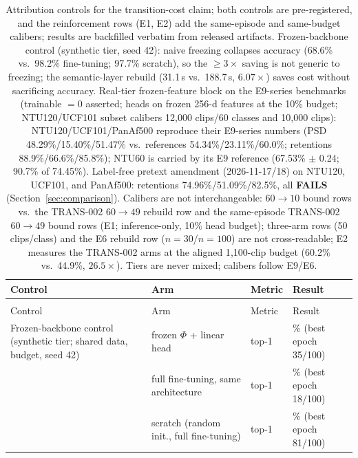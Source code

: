\begingroup
\footnotesize
{}
\begin{longtable}{>{\raggedright\arraybackslash}p{3.2cm}>{\raggedright\arraybackslash}p{2.6cm}>{\raggedright\arraybackslash}p{2.6cm}>{\raggedright\arraybackslash}p{\dimexpr\linewidth-8.4cm-8\tabcolsep\relax}}
\caption{Attribution controls for the transition-cost claim; both controls are pre-registered, and the reinforcement rows (E1, E2) add the same-episode and same-budget calibers; results are backfilled verbatim from released artifacts. Frozen-backbone control (synthetic tier, seed 42): naive freezing collapses accuracy (68.6\% vs.\ 98.2\% fine-tuning; 97.7\% scratch), so the $\geq 3\times$ saving is not generic to freezing; the semantic-layer rebuild (31.1\,s vs.\ 188.7\,s, $6.07\times$) saves cost without sacrificing accuracy. Real-tier frozen-feature block on the E9-series benchmarks (trainable $=0$ asserted; heads on frozen 256-d features at the 10\% budget; NTU120/UCF101 subset calibers 12{,}000 clips/60 classes and 10{,}000 clips): NTU120/UCF101/PanAf500 reproduce their E9-series numbers (PSD 48.29\%/15.40\%/51.47\% vs.\ references 54.34\%/23.11\%/60.0\%; retentions 88.9\%/66.6\%/85.8\%); NTU60 is carried by its E9 reference (67.53\% $\pm$ 0.24; 90.7\% of 74.45\%). Label-free pretext amendment (2026-11-17/18) on NTU120, UCF101, and PanAf500: retentions 74.96\%/51.09\%/82.5\%, all \textbf{FAILS} (Section~\ref{sec:comparison}). Calibers are not interchangeable: $60\to10$ bound rows vs.\ the TRANS-002 $60\to49$ rebuild row and the same-episode TRANS-002 $60\to49$ bound rows (E1; inference-only, 10\% head budget); three-arm rows (50 clips/class) and the E6 rebuild row ($n{=}30$/$n{=}100$) are not cross-readable; E2 measures the TRANS-002 arms at the aligned 1{,}100-clip budget (60.2\% vs.\ 44.9\%, $26.5\times$). Tiers are never mixed; calibers follow E9/E6.}
\label{tab:attribution-controls}\\
\hline
Control & Arm & Metric & Result \\
\hline
\endfirsthead
\multicolumn{4}{@{}l@{}}{Table~\thetable{} (continued)}\\
\hline
Control & Arm & Metric & Result \\
\hline
\endhead
\hline
\endfoot
Frozen-backbone control (synthetic tier; shared data, budget, seed 42) & frozen $\Phi$ + linear head & top-1 & 68.6\% (best epoch 35/100) \\
 & full fine-tuning, same architecture & top-1 & 98.2\% (best epoch 18/100) \\
 & scratch (random init., full fine-tuning) & top-1 & 97.7\% (best epoch 81/100) \\

\end{longtable}
